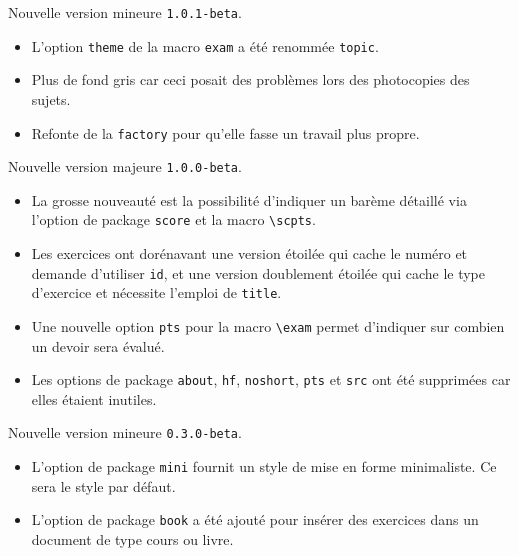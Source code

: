 \documentclass[12pt,a4paper]{scrartcl}
\theoremstyle{definition}
\begin{document}
\begin{description}[leftmargin=1em]
    \setlength\itemsep{1em}
    \item[2019-02-16] Nouvelle version mineure \verb+1.0.1-beta+.
        \begin{itemize}
            \item L'option \verb+theme+ de la macro \verb+exam+ a été renommée \verb+topic+.

            \item Plus de fond gris car ceci posait des problèmes lors des photocopies des sujets.

            \item Refonte de la \verb+factory+ pour qu'elle fasse un travail plus propre.
        \end{itemize}


    \item[2017-12-13] Nouvelle version majeure \verb+1.0.0-beta+.
        \begin{itemize}
            \item La grosse nouveauté est la possibilité d'indiquer un barème détaillé via l'option de package \verb+score+ et la macro \verb+\scpts+.

            \item Les exercices ont dorénavant une version étoilée qui cache le numéro et demande d'utiliser \verb+id+, et une version doublement étoilée qui cache le type d'exercice et nécessite l'emploi de \verb+title+.

            \item Une nouvelle option \verb+pts+ pour la macro \verb+\exam+ permet d'indiquer sur combien un devoir sera évalué.

            \item Les options de package \verb+about+, \verb+hf+, \verb+noshort+, \verb+pts+ et \verb+src+ ont été supprimées car elles étaient inutiles.
        \end{itemize}


    \item[2017-12-02] Nouvelle version mineure \verb+0.3.0-beta+.
    \begin{itemize}
        \item L'option de package \verb+mini+ fournit un style de mise en forme minimaliste. Ce sera le style par défaut.

        \item L'option de package \verb+book+ a été ajouté pour insérer des exercices dans un document de type cours ou livre.


\end{itemize}
\end{description}
\end{document}
